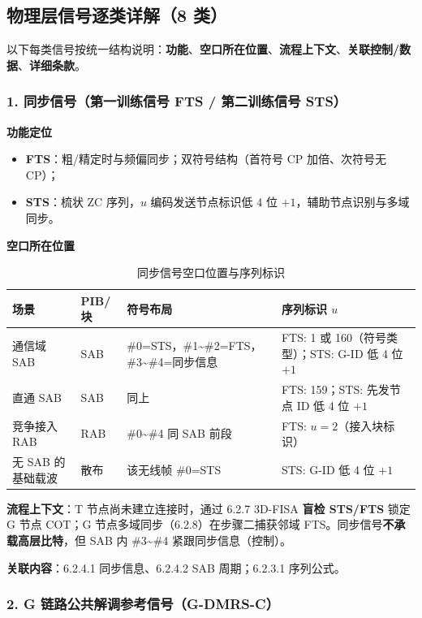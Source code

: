 \documentclass[11pt,a4paper]{ctexart}
\begin{document}
\subsection{物理层信号逐类详解（8 类）}

以下每类信号按统一结构说明：\textbf{功能}、\textbf{空口所在位置}、\textbf{流程上下文}、\textbf{关联控制/数据}、\textbf{详细条款}。

\subsubsection{1. 同步信号（第一训练信号 FTS / 第二训练信号 STS）}

\textbf{功能定位}
\begin{itemize}[nosep]
  \item \textbf{FTS}：粗/精定时与频偏同步；双符号结构（首符号 CP 加倍、次符号无 CP）；
  \item \textbf{STS}：梳状 ZC 序列，$u$ 编码发送节点标识低 4 位 $+1$，辅助节点识别与多域同步。
\end{itemize}

\textbf{空口所在位置}
\begin{longtable}{llll}
\caption{同步信号空口位置与序列标识} \\
\toprule
\textbf{场景} & \textbf{PIB/块} & \textbf{符号布局} & \textbf{序列标识 $u$} \\
\midrule
通信域 SAB & SAB & \#0=STS，\#1\textasciitilde\#2=FTS，\#3\textasciitilde\#4=同步信息 &
FTS: 1 或 160（符号类型）；STS: G-ID 低 4 位 $+1$ \\
直通 SAB & SAB & 同上 &
FTS: 159；STS: 先发节点 ID 低 4 位 $+1$ \\
竞争接入 RAB & RAB & \#0\textasciitilde\#4 同 SAB 前段 &
FTS: $u{=}2$（接入块标识） \\
无 SAB 的基础载波 & 散布 & 该无线帧 \#0=STS &
STS: G-ID 低 4 位 $+1$ \\
\bottomrule
\end{longtable}

\textbf{流程上下文}：T 节点尚未建立连接时，通过 6.2.7 3D-FISA \textbf{盲检 STS/FTS} 锁定 G 节点 COT；G 节点多域同步（6.2.8）在步骤二捕获邻域 FTS。同步信号\textbf{不承载高层比特}，但 SAB 内 \#3\textasciitilde\#4 紧跟同步信息（控制）。

\textbf{关联内容}：6.2.4.1 同步信息、6.2.4.2 SAB 周期；6.2.3.1 序列公式。

\subsubsection{2. G 链路公共解调参考信号（G-DMRS-C）}
\end{document}
